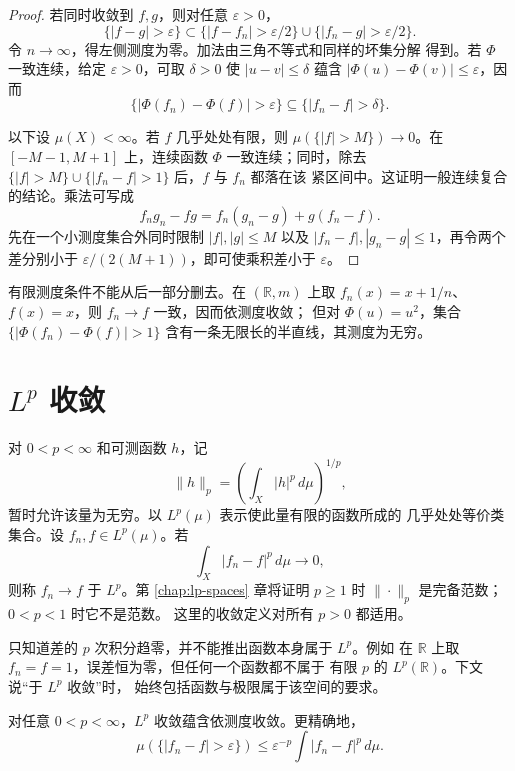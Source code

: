 \begin{proof}
若同时收敛到 \(f,g\)，则对任意 \(\varepsilon>0\)，
\[
 \{|f-g|>\varepsilon\}
 \subset\{|f-f_n|>\varepsilon/2\}
 \cup\{|f_n-g|>\varepsilon/2\}.
\]
令 \(n\to\infty\)，得左侧测度为零。加法由三角不等式和同样的坏集分解
得到。若 \(\Phi\) 一致连续，给定 \(\varepsilon>0\)，可取 \(\delta>0\)
使 \(|u-v|\le\delta\) 蕴含
\(|\Phi(u)-\Phi(v)|\le\varepsilon\)，因而
\[
 \{|\Phi(f_n)-\Phi(f)|>\varepsilon\}
 \subseteq\{|f_n-f|>\delta\}.
\]

以下设 \(\mu(X)<\infty\)。若 \(f\) 几乎处处有限，则
\(\mu(\{|f|>M\})\to0\)。在 \([-M-1,M+1]\) 上，连续函数 \(\Phi\)
一致连续；同时，除去
\(\{|f|>M\}\cup\{|f_n-f|>1\}\) 后，\(f\) 与 \(f_n\) 都落在该
紧区间中。这证明一般连续复合的结论。乘法可写成
\[
 f_ng_n-fg=f_n(g_n-g)+g(f_n-f).
\]
先在一个小测度集合外同时限制 \(|f|,|g|\le M\) 以及
\(|f_n-f|,|g_n-g|\le1\)，再令两个差分别小于
\(\varepsilon/(2(M+1))\)，即可使乘积差小于 \(\varepsilon\)。
\end{proof}

有限测度条件不能从后一部分删去。在 \((\mathbb R,m)\) 上取
\(f_n(x)=x+1/n\)、\(f(x)=x\)，则 \(f_n\to f\) 一致，因而依测度收敛；
但对 \(\Phi(u)=u^2\)，集合
\(\{|\Phi(f_n)-\Phi(f)|>1\}\) 含有一条无限长的半直线，其测度为无穷。

\section{\texorpdfstring{\(L^p\)}{Lp} 收敛}

对 \(0<p<\infty\) 和可测函数 \(h\)，记
\[
 \|h\|_p=\left(\int_X|h|^p\,d\mu\right)^{1/p},
\]
暂时允许该量为无穷。以 \(L^p(\mu)\) 表示使此量有限的函数所成的
几乎处处等价类集合。设 \(f_n,f\in L^p(\mu)\)。若
\[
 \int_X|f_n-f|^p\,d\mu\longrightarrow0,
\]
则称 \(f_n\to f\) 于 \(L^p\)。第 \ref{chap:lp-spaces} 章将证明
\(p\ge1\) 时 \(\|\cdot\|_p\) 是完备范数；\(0<p<1\) 时它不是范数。
这里的收敛定义对所有 \(p>0\) 都适用。

只知道差的 \(p\) 次积分趋零，并不能推出函数本身属于 \(L^p\)。例如
在 \(\mathbb R\) 上取 \(f_n=f=1\)，误差恒为零，但任何一个函数都不属于
有限 \(p\) 的 \(L^p(\mathbb R)\)。下文说“于 \(L^p\) 收敛”时，
始终包括函数与极限属于该空间的要求。

\begin{theorem}
\label{thm:lp-implies-measure}
对任意 \(0<p<\infty\)，\(L^p\) 收敛蕴含依测度收敛。更精确地，
\[
 \mu(\{|f_n-f|>\varepsilon\})
 \le\varepsilon^{-p}\int|f_n-f|^p\,d\mu .
\]
\end{theorem}

